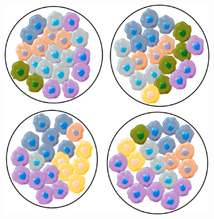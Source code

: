 \begin{figure}[tbh]
    \centering
    \begin{subfigure}{0.43\textwidth}
        \includegraphics[width=\linewidth,keepaspectratio]{images/intro/heterogeneity_example}
        \vspace{-0.5cm}
        \caption{}\label{fig:intro:heterogeneity_example}
    \end{subfigure}%
    \hspace{1cm}%
    \begin{subfigure}{0.31\textwidth}

\end{subfigure}
\end{figure}
